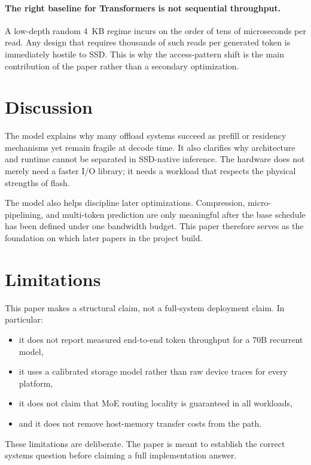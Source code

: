 \documentclass[11pt]{article}
\begin{document}
\paragraph{The right baseline for Transformers is not sequential throughput.}
A low-depth random 4~KB regime incurs on the order of tens of microseconds per read. Any design that requires thousands of such reads per generated token is immediately hostile to SSD. This is why the access-pattern shift is the main contribution of the paper rather than a secondary optimization.

\section{Discussion}
The model explains why many offload systems succeed as prefill or residency mechanisms yet remain fragile at decode time. It also clarifies why architecture and runtime cannot be separated in SSD-native inference. The hardware does not merely need a faster I/O library; it needs a workload that respects the physical strengths of flash.

The model also helps discipline later optimizations. Compression, micro-pipelining, and multi-token prediction are only meaningful after the base schedule has been defined under one bandwidth budget. This paper therefore serves as the foundation on which later papers in the project build.

\section{Limitations}
This paper makes a structural claim, not a full-system deployment claim. In particular:
\begin{itemize}
    \item it does not report measured end-to-end token throughput for a 70B recurrent model,
    \item it uses a calibrated storage model rather than raw device traces for every platform,
    \item it does not claim that MoE routing locality is guaranteed in all workloads,
    \item and it does not remove host-memory transfer costs from the path.
\end{itemize}

These limitations are deliberate. The paper is meant to establish the correct systems question before claiming a full implementation answer.
\end{document}
